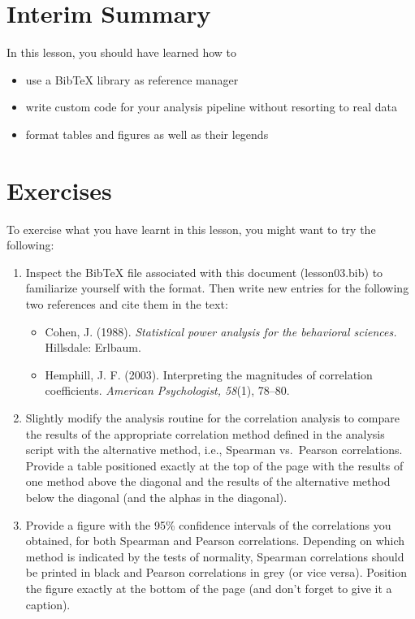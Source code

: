 \documentclass[
]{article}
\providecommand{\tightlist}{%
  \setlength{\itemsep}{0pt}\setlength{\parskip}{0pt}}
\begin{document}
\hypertarget{interim-summary}{%
\section{Interim Summary}\label{interim-summary}}

In this lesson, you should have learned how to

\begin{itemize}
\tightlist
\item
  use a BibTeX library as reference manager
\item
  write custom code for your analysis pipeline without resorting to real
  data
\item
  format tables and figures as well as their legends
\end{itemize}

\hypertarget{exercises}{%
\section{Exercises}\label{exercises}}

To exercise what you have learnt in this lesson, you might want to try
the following:

\begin{enumerate}
\def\labelenumi{\arabic{enumi}.}
\tightlist
\item
  Inspect the BibTeX file associated with this document (lesson03.bib)
  to familiarize yourself with the format. Then write new entries for
  the following two references and cite them in the text:

  \begin{itemize}
  \tightlist
  \item
    Cohen, J. (1988). \emph{Statistical power analysis for the
    behavioral sciences.} Hillsdale: Erlbaum.
  \item
    Hemphill, J. F. (2003). Interpreting the magnitudes of correlation
    coefficients. \emph{American Psychologist, 58}(1), 78--80.
  \end{itemize}
\item
  Slightly modify the analysis routine for the correlation analysis to
  compare the results of the appropriate correlation method defined in
  the analysis script with the alternative method, i.e., Spearman
  vs.~Pearson correlations. Provide a table positioned exactly at the
  top of the page with the results of one method above the diagonal and
  the results of the alternative method below the diagonal (and the
  alphas in the diagonal).\\
\item
  Provide a figure with the 95\% confidence intervals of the
  correlations you obtained, for both Spearman and Pearson correlations.
  Depending on which method is indicated by the tests of normality,
  Spearman correlations should be printed in black and Pearson
  correlations in grey (or vice versa). Position the figure exactly at
  the bottom of the page (and don't forget to give it a caption).
\end{enumerate}
\end{document}
